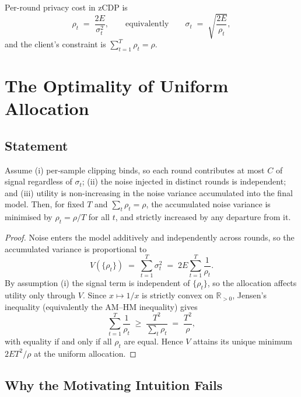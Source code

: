 Per-round privacy cost in zCDP is
\begin{equation}
  \rho_t \;=\; \frac{2E}{\sigma_t^{2}},
  \qquad\text{equivalently}\qquad
  \sigma_t \;=\; \sqrt{\frac{2E}{\rho_t}},
  \label{eq:budget}
\end{equation}
and the client's constraint is $\sum_{t=1}^{T}\rho_t = \rho$.

\section{The Optimality of Uniform Allocation}
\label{sec:theory}

\subsection{Statement}

\begin{theorem}
\label{thm:uniform}
Assume (i) per-sample clipping binds, so each round contributes at most $C$ of
signal regardless of $\sigma_t$; (ii) the noise injected in distinct rounds is
independent; and (iii) utility is non-increasing in the noise variance
accumulated into the final model. Then, for fixed $T$ and $\sum_t\rho_t=\rho$,
the accumulated noise variance is minimised by $\rho_t = \rho/T$ for all $t$, and
strictly increased by any departure from it.
\end{theorem}

\begin{proof}
Noise enters the model additively and independently across rounds, so the
accumulated variance is proportional to
\begin{equation}
  V(\{\rho_t\}) \;=\; \sum_{t=1}^{T}\sigma_t^{2}
  \;=\; 2E\sum_{t=1}^{T}\frac{1}{\rho_t}.
  \label{eq:variance}
\end{equation}
By assumption (i) the signal term is independent of $\{\rho_t\}$, so the
allocation affects utility only through $V$. Since $x\mapsto 1/x$ is strictly
convex on $\mathbb{R}_{>0}$, Jensen's inequality (equivalently the AM--HM
inequality) gives
\begin{equation}
  \sum_{t=1}^{T}\frac{1}{\rho_t} \;\ge\; \frac{T^{2}}{\sum_t \rho_t}
  \;=\; \frac{T^{2}}{\rho},
\end{equation}
with equality if and only if all $\rho_t$ are equal. Hence $V$ attains its unique
minimum $2ET^{2}/\rho$ at the uniform allocation.
\end{proof}

\subsection{Why the Motivating Intuition Fails}

